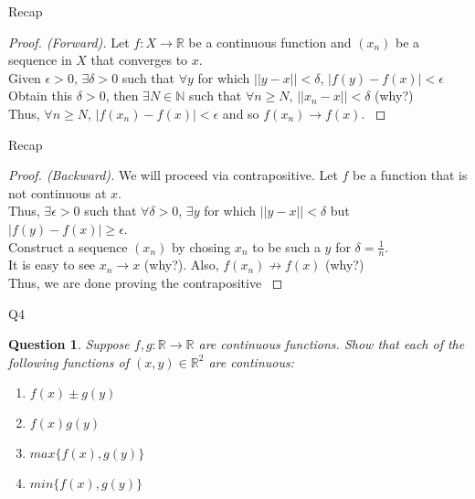 \documentclass[aspectratio=169]{beamer}
\newtheorem{qsn}{Question}
\newcommand{\bN}{\mathbb{N}}
\newcommand{\bR}{\mathbb{R}}
\newcommand{\norm}[1]{|#1|}
\newcommand{\normtwo}[1]{||#1||}
\begin{document}
\begin{frame}{Recap}
    \begin{proof}[Proof. (Forward)]
     {
    Let $f:X\to\bR$ be a continuous function and $(x_n)$ be a sequence in $X$ that converges to $x$.\\
    }
     {
    Given $\epsilon>0$, $\exists \delta>0$ such that $\forall y$ for which $\normtwo{y-x}<\delta$, $\norm{f(y)-f(x)}<\epsilon$\\
    }
     {
    Obtain this $\delta>0$, then $\exists N\in\bN$ such that $\forall n\geq N$, $\normtwo{x_n-x} < \delta$ (why?)\\
    }
     {
    Thus, $\forall n\geq N$, $\norm{f(x_n)-f(x)}<\epsilon$ and so $f(x_n)\to f(x)$.
    }
    \end{proof}
\end{frame}

\begin{frame}{Recap}
    \begin{proof}[Proof. (Backward)]
     {
    We will proceed via contrapositive. Let $f$ be a function that is not continuous at $x$.\\
    }
     {
    Thus, $\exists \epsilon>0$ such that $\forall \delta>0$, $\exists y$ for which $\normtwo{y-x}<\delta$ but $\norm{f(y)-f(x)}\geq \epsilon$.\\
    }
     {
    Construct a sequence $(x_n)$ by chosing $x_n$ to be such a $y$ for $\delta = \frac{1}{n}$.\\
    }
     {
    It is easy to see $x_n \to x$ (why?). Also, $f(x_n) \not\to f(x)$ (why?)\\
    }
     {
    Thus, we are done proving the contrapositive
    }
    \end{proof}
\end{frame}

\begin{frame}{Q4}
	\begin{qsn}
    Suppose $f, g : \mathbb{R} \to \mathbb{R}$ are continuous functions. Show that each of the following functions of
    $(x, y) \in \mathbb{R}^2$ are continuous:
    \begin{enumerate}
    	\item $f(x) \pm g(y)$
    	\item $f(x)g(y)$
    	\item $max\{f(x), g(y)\}$
    	\item $min\{f(x), g(y)\}$
    \end{enumerate}
    \end{qsn}
\end{frame}
\end{document}
